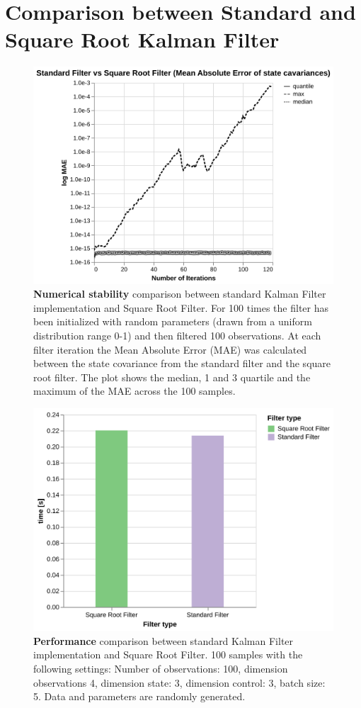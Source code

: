 \documentclass{article}
\let\Oldsection\section
\renewcommand{\section}{\FloatBarrier\Oldsection}
\begin{document}
\section{Comparison between Standard and Square Root Kalman Filter}

\begin{figure}
\includegraphics[width=\textwidth]{numerical_stability}
 \caption{\textbf{Numerical stability} comparison between standard Kalman Filter implementation and Square Root Filter. For 100 times the filter has been initialized with random parameters (drawn from a uniform distribution range 0-1) and then filtered 100 observations. At each filter iteration the Mean Absolute Error (MAE) was calculated between the state covariance from the standard filter and the square root filter. The plot shows the median, 1 and 3 quartile and the maximum of the MAE across the 100 samples.}
\end{figure}

\begin{figure}
\includegraphics[width=\textwidth]{perf_sr}
 \caption{\textbf{Performance} comparison between standard Kalman Filter implementation and Square Root Filter. 100 samples with the following settings: Number of observations: 100, dimension observations 4, dimension state: 3, dimension control: 3, batch size: 5. Data and parameters are randomly generated.}
\end{figure}
\end{document}

